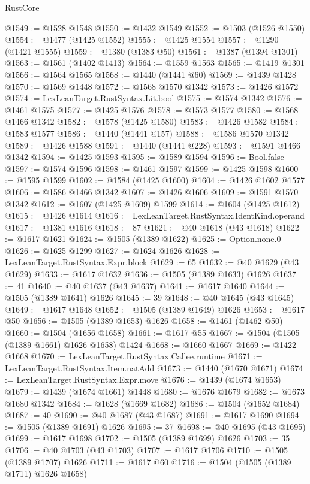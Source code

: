 \begin{lexlean}{RustCore}
\begin{coremodule}
@1549 := @1528 @1548
@1550 := @1432 @1549
@1552 := @1503 (@1526 @1550)
@1554 := @1477 (@1425 @1552)
@1555 := @1425 @1554
@1557 := @1290 (@1421 @1555)
@1559 := @1380 (@1383 @50)
@1561 := @1387 (@1394 @1301)
@1563 := @1561 (@1402 @1413)
@1564 := @1559 @1563
@1565 := @1419 @1301
@1566 := @1564 @1565
@1568 := @1440 (@1441 @60)
@1569 := @1439 @1428
@1570 := @1569 @1448
@1572 := @1568 @1570 @1342
@1573 := @1426 @1572
@1574 := LexLeanTarget.RustSyntax.Lit.bool
@1575 := @1574 @1342
@1576 := @1461 @1575
@1577 := @1425 @1576
@1578 := @1573 @1577
@1580 := @1568 @1466 @1342
@1582 := @1578 (@1425 @1580)
@1583 := @1426 @1582
@1584 := @1583 @1577
@1586 := @1440 (@1441 @157)
@1588 := @1586 @1570 @1342
@1589 := @1426 @1588
@1591 := @1440 (@1441 @228)
@1593 := @1591 @1466 @1342
@1594 := @1425 @1593
@1595 := @1589 @1594
@1596 := Bool.false
@1597 := @1574 @1596
@1598 := @1461 @1597
@1599 := @1425 @1598
@1600 := @1595 @1599
@1602 := @1584 (@1425 @1600)
@1604 := @1426 @1602 @1577
@1606 := @1586 @1466 @1342
@1607 := @1426 @1606
@1609 := @1591 @1570 @1342
@1612 := @1607 (@1425 @1609) @1599
@1614 := @1604 (@1425 @1612)
@1615 := @1426 @1614
@1616 := LexLeanTarget.RustSyntax.IdentKind.operand
@1617 := @1381 @1616
@1618 := 87
@1621 := @40 @1618 (@43 @1618)
@1622 := @1617 @1621
@1624 := @1505 (@1389 @1622)
@1625 := Option.none.{0}
@1626 := @1625 @1299
@1627 := @1624 @1626
@1628 := LexLeanTarget.RustSyntax.Expr.block
@1629 := 65
@1632 := @40 @1629 (@43 @1629)
@1633 := @1617 @1632
@1636 := @1505 (@1389 @1633) @1626
@1637 := 41
@1640 := @40 @1637 (@43 @1637)
@1641 := @1617 @1640
@1644 := @1505 (@1389 @1641) @1626
@1645 := 39
@1648 := @40 @1645 (@43 @1645)
@1649 := @1617 @1648
@1652 := @1505 (@1389 @1649) @1626
@1653 := @1617 @50
@1656 := @1505 (@1389 @1653) @1626
@1658 := @1461 (@1462 @50)
@1660 := @1504 (@1656 @1658)
@1661 := @1617 @55
@1667 := @1504 (@1505 (@1389 @1661) @1626 @1658) @1424
@1668 := @1660 @1667
@1669 := @1422 @1668
@1670 := LexLeanTarget.RustSyntax.Callee.runtime
@1671 := LexLeanTarget.RustSyntax.Item.natAdd
@1673 := @1440 (@1670 @1671)
@1674 := LexLeanTarget.RustSyntax.Expr.move
@1676 := @1439 (@1674 @1653)
@1679 := @1439 (@1674 @1661) @1448
@1680 := @1676 @1679
@1682 := @1673 @1680 @1342
@1684 := @1628 (@1669 @1682)
@1686 := @1504 (@1652 @1684)
@1687 := 40
@1690 := @40 @1687 (@43 @1687)
@1691 := @1617 @1690
@1694 := @1505 (@1389 @1691) @1626
@1695 := 37
@1698 := @40 @1695 (@43 @1695)
@1699 := @1617 @1698
@1702 := @1505 (@1389 @1699) @1626
@1703 := 35
@1706 := @40 @1703 (@43 @1703)
@1707 := @1617 @1706
@1710 := @1505 (@1389 @1707) @1626
@1711 := @1617 @60
@1716 := @1504 (@1505 (@1389 @1711) @1626 @1658)

\end{coremodule}
\end{lexlean}
